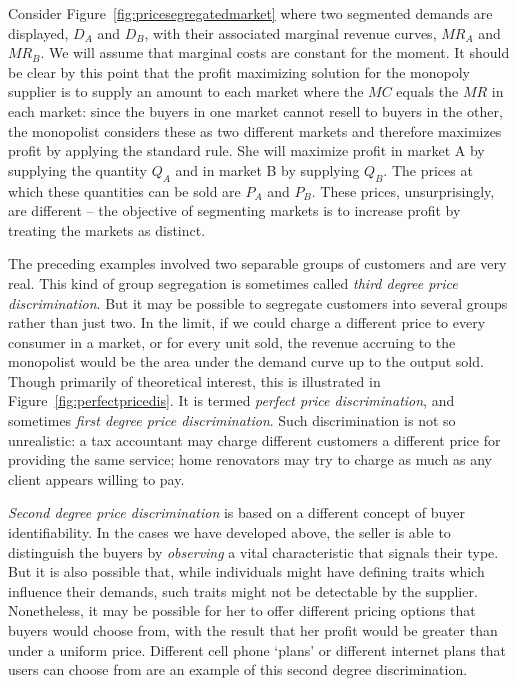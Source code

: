 Consider Figure~\ref{fig:pricesegregatedmarket} where two segmented demands are displayed, $D_A$ and $D_B$, with their associated marginal revenue curves, $MR_A$ and $MR_B$. We will assume that marginal costs are constant for the moment. It should be clear by this point that the profit maximizing solution for the monopoly supplier is to supply an amount to each market where the $MC$ equals the $MR$ in each market: since the buyers in one market cannot resell to buyers in the other, the monopolist considers these as two different markets and therefore maximizes profit by applying the standard rule. She will maximize profit in market A by supplying the quantity $Q_A$ and in market B by supplying $Q_B$. The prices at which these quantities can be sold are $P_A$ and $P_B$. These prices, unsurprisingly, are different -- the objective of segmenting markets is to increase profit by treating the markets as distinct. 



The preceding examples involved two separable groups of customers and are very real. This kind of group segregation is sometimes called \textit{third degree price discrimination}.  But it may be possible to segregate customers into several groups rather than just two. In the limit, if we could charge a different price to every consumer in a market, or for every unit sold, the revenue accruing to the monopolist would be the area under the demand curve up to the output sold. Though primarily of theoretical interest, this is illustrated in Figure~\ref{fig:perfectpricedis}. It is termed \textit{perfect price discrimination}, and sometimes \textit{first degree price discrimination}. Such discrimination is not so unrealistic: a tax accountant may charge different customers a different price for providing the same service; home renovators may try to charge as much as any client appears willing to pay.



\textit{Second degree price discrimination} is based on a different concept of buyer identifiability. In the cases we have developed above, the seller is able to distinguish the buyers by \textit{observing} a vital characteristic that signals their type. But it is also possible that, while individuals might have defining traits which influence their demands, such traits might not be detectable by the supplier. Nonetheless, it may be possible for her to offer different pricing options that buyers would choose from, with the result that her profit would be greater than under a uniform price. Different cell phone `plans' or different internet plans that users can choose from are an example of this second degree discrimination.